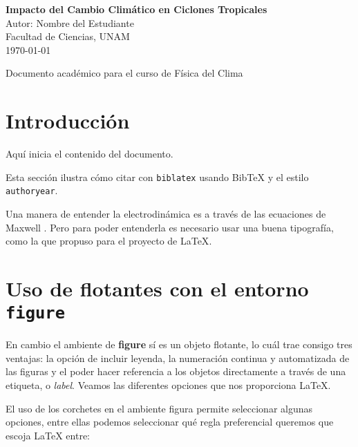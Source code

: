 \documentclass[12pt]{article}
\begin{document}
\begin{titlepage}
    \begin{center}
        \vspace*{2cm} %
        {\Huge\bfseries Impacto del Cambio Climático en Ciclones Tropicales}\\[1cm]
        {\Large Autor: Nombre del Estudiante}\\[0.5cm]
        {\large Facultad de Ciencias, UNAM}\\[1cm]
        {\large \today}
    \end{center}
    \vfill %
    \begin{center}
        {\small Documento académico para el curso de Física del Clima}
    \end{center}
\end{titlepage}



\tableofcontents

\listoffigures
\listoftables

\clearpage

\section*{Introducción}

Aquí inicia el contenido del documento. \lipsum[1]

Esta sección ilustra cómo citar con \texttt{biblatex} usando BibTeX 
y el estilo \texttt{authoryear}.

Una manera de entender la electrodinámica es a través de las ecuaciones de Maxwell \cite{einstein1905}. Pero para poder entenderla es necesario usar una buena tipografía, como la que propuso \cite{knuth1984} para el proyecto de \LaTeX \cite{latexproject}.

\section{Uso de flotantes con el entorno \texttt{figure}}

En cambio el ambiente de \textbf{figure} sí es un objeto flotante, lo cuál trae consigo tres ventajas: la opción de incluir leyenda, la numeración continua y automatizada de las figuras y el poder hacer referencia a los objetos directamente a través de una etiqueta, o \textit{label}. 
Veamos las diferentes opciones que nos proporciona \LaTeX{}. 

El uso de los corchetes en el ambiente figura permite seleccionar algunas opciones, entre ellas podemos seleccionar qué regla preferencial queremos que escoja \LaTeX{} entre:
\end{document}
